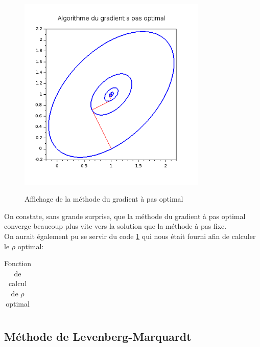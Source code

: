\documentclass[a4paper,10pt]{report}
\begin{document}
\begin{figure}[H]
\centering
\caption{Affichage de la méthode du gradient à pas optimal}
\includegraphics[width=9cm]{gradient2.png}
\label{graph_gradient2}
\end{figure}

On constate, sans grande surprise, que la méthode du gradient à pas optimal converge beaucoup plus vite vers la solution que la méthode à pas fixe.\\

On aurait également pu se servir du code \ref{pas_opt} qui nous était fourni afin de calculer le $\rho$ optimal:
\begin{table}[H]
\caption{Fonction de calcul de $\rho$ optimal}
\begin{tabular}{l}

\label{pas_opt}
\end{tabular}
\end{table}

\newpage
\subsection{Méthode de Levenberg-Marquardt}
\end{document}
